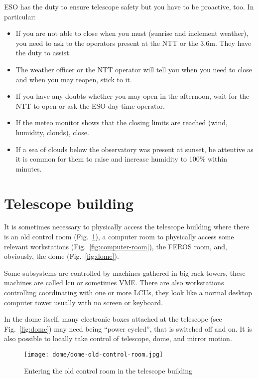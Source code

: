 \documentclass[11pt,fleqn]{book} %
\begin{document}
ESO has the duty to ensure telescope safety but you have to be proactive, too.  In particular:
\begin{itemize}
\item If you are not able to close when you must (sunrise and inclement weather), you need to ask to the operators present at the NTT or the 3.6m. They have the duty to assist.  
\item The weather officer or the NTT operator will tell you when you need to close and when you may reopen, stick to it.
\item If you have any doubts whether you may open in the afternoon, wait for the NTT to open or ask the ESO day-time operator.
\item If the meteo monitor shows that the closing limits are reached (wind, humidity, clouds), close.
\item If a sea of clouds below the observatory was present at sunset, be attentive as it is common for them to raise and increase humidity to 100\% within minutes.
\end{itemize}

\section{Telescope building}

It is sometimes necessary to physically access the telescope building where there is an old control room (Fig.~\ref{fig:old-control-room}), a computer room to physically access some relevant workstations (Fig.~\ref{fig:computer-room}), the FEROS room, and, obviously, the dome (Fig.~\ref{fig:dome}).  

Some subsystems are controlled by machines gathered in big rack towers, these machines are called \gls{lcu} or sometimes VME.  There are also workstations controlling coordinating with one or more LCUs, they look like a normal desktop computer tower usually with no screen or keyboard.

In the dome itself, many electronic boxes attached at the telescope (see Fig.~\ref{fig:dome}) may need being ``power cycled'', that is switched off and on.  It is also possible to locally take control of telescope, dome, and mirror motion.

\begin{figure}[!ht]
\centering
\texttt{[image: dome/dome-old-control-room.jpg]}
\caption{Entering the old control room in the telescope building}
\label{fig:old-control-room}
\end{figure}
\end{document}
